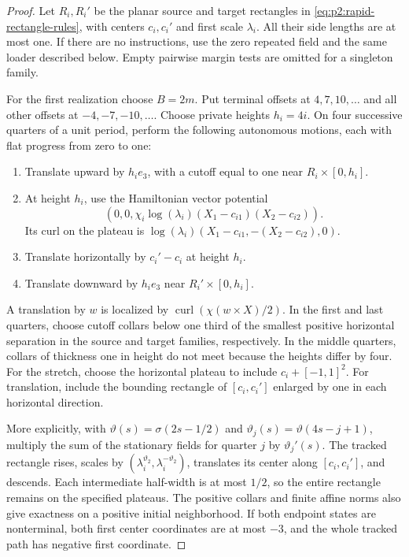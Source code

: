 \begin{proof}
Let $R_i,R_i'$ be the planar source and target rectangles in
\eqref{eq:p2:rapid-rectangle-rules}, with centers $c_i,c_i'$ and first
scale $\lambda_i$. All their side lengths are at most one. If there are
no instructions, use the zero repeated field and the same loader described
below. Empty pairwise margin tests are omitted for a singleton family.

For the first realization choose $B=2m$. Put terminal offsets at
$4,7,10,\ldots$ and all other offsets at $-4,-7,-10,\ldots$.
Choose private heights $h_i=4i$. On four successive quarters of a unit
period, perform the following autonomous motions, each with flat progress
from zero to one:
\begin{enumerate}
\item Translate upward by $h_i e_3$, with a cutoff equal to one near
$R_i\times[0,h_i]$.
\item At height $h_i$, use the Hamiltonian vector potential
\[
 (0,0,\chi_i\log(\lambda_i)
                (X_1-c_{i1})(X_2-c_{i2})).
\]
Its curl on the plateau is
$\log(\lambda_i)(X_1-c_{i1},-(X_2-c_{i2}),0)$.
\item Translate horizontally by $c_i'-c_i$ at height $h_i$.
\item Translate downward by $h_i e_3$ near $R_i'\times[0,h_i]$.
\end{enumerate}
A translation by $w$ is localized by
$\operatorname{curl}(\chi(w\times X)/2)$.
In the first and last quarters, choose cutoff collars below one third
of the smallest positive horizontal separation in the source and target
families, respectively. In the middle quarters, collars of thickness
one in height do not meet because the heights differ by four. For the
stretch, choose the horizontal plateau to include
$c_i+[-1,1]^2$. For translation, include the bounding rectangle of
$[c_i,c_i']$ enlarged by one in each horizontal direction.

More explicitly, with $\vartheta(s)=\sigma(2s-1/2)$ and
$\vartheta_j(s)=\vartheta(4s-j+1)$, multiply the sum of the stationary
fields for quarter $j$ by $\vartheta_j'(s)$. The tracked rectangle rises,
scales by $(\lambda_i^{\vartheta_2},\lambda_i^{-\vartheta_2})$,
translates its center along $[c_i,c_i']$, and descends. Each intermediate
half-width is at most $1/2$, so the entire rectangle remains on the
specified plateaus. The positive collars and finite affine norms also
give exactness on a positive initial neighborhood. If both endpoint
states are nonterminal, both first center coordinates are at most
$-3$, and the whole tracked path has negative first coordinate.


\end{proof}

